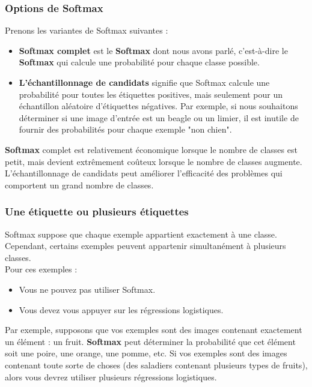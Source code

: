 \documentclass[french]{article}
\begin{document}
\subsubsection{Options de Softmax}
Prenons les variantes de Softmax suivantes :\\
\begin{itemize}[label=$\Diamond$]
	\item \textbf{Softmax complet} est le \textbf{Softmax} dont nous avons parlé, c'est-à-dire le \textbf{Softmax} qui calcule une probabilité pour chaque classe possible.\\
	\item \textbf{L'échantillonnage de candidats} signifie que Softmax calcule une probabilité pour toutes les étiquettes positives, mais seulement pour un échantillon aléatoire d'étiquettes négatives. Par exemple, si nous souhaitons déterminer si une image d'entrée est un beagle ou un limier, il est inutile de fournir des probabilités pour chaque exemple "non chien".\\
\end{itemize}
\textbf{Softmax} complet est relativement économique lorsque le nombre de classes est petit, mais devient extrêmement coûteux lorsque le nombre de classes augmente. L'échantillonnage de candidats peut améliorer l'efficacité des problèmes qui comportent un grand nombre de classes.

\subsubsection{Une étiquette ou plusieurs étiquettes}
Softmax suppose que chaque exemple appartient exactement à une classe. Cependant, certains exemples peuvent appartenir simultanément à plusieurs classes.\\ Pour ces exemples :
\begin{itemize}[label=\textbullet]
	\item Vous ne pouvez pas utiliser Softmax.
	\item Vous devez vous appuyer sur les régressions logistiques.\\
\end{itemize}
Par exemple, supposons que vos exemples sont des images contenant exactement un élément : un fruit. \textbf{Softmax} peut déterminer la probabilité que cet élément soit une poire, une orange, une pomme, etc. Si vos exemples sont des images contenant toute sorte de choses (des saladiers contenant plusieurs types de fruits), alors vous devrez utiliser plusieurs régressions logistiques.


    
\end{document}
